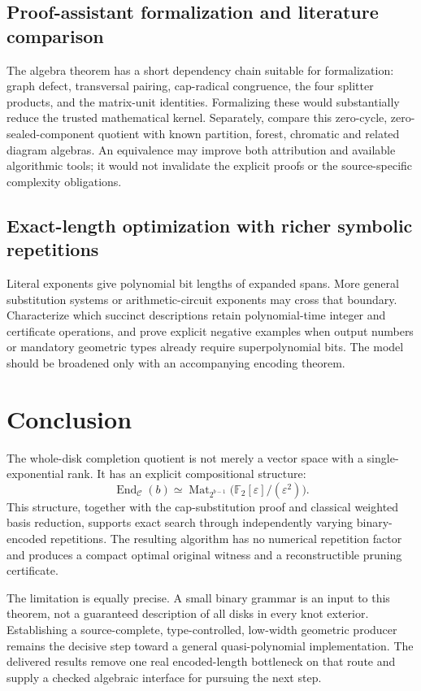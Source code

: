 \documentclass[11pt,a4paper]{article}
\theoremstyle{definition}
\newcommand{\F}{\mathbb F_2}
\newcommand{\Mat}{\operatorname{Mat}}
\newcommand{\End}{\operatorname{End}}
\newcommand{\eps}{\varepsilon}
\begin{document}
\subsection{Proof-assistant formalization and literature comparison}
The algebra theorem has a short dependency chain suitable for formalization: graph defect, transversal pairing, cap-radical congruence, the four splitter products, and the matrix-unit identities. Formalizing these would substantially reduce the trusted mathematical kernel. Separately, compare this zero-cycle, zero-sealed-component quotient with known partition, forest, chromatic and related diagram algebras. An equivalence may improve both attribution and available algorithmic tools; it would not invalidate the explicit proofs or the source-specific complexity obligations.

\subsection{Exact-length optimization with richer symbolic repetitions}
Literal exponents give polynomial bit lengths of expanded spans. More general substitution systems or arithmetic-circuit exponents may cross that boundary. Characterize which succinct descriptions retain polynomial-time integer and certificate operations, and prove explicit negative examples when output numbers or mandatory geometric types already require superpolynomial bits. The model should be broadened only with an accompanying encoding theorem.

\section{Conclusion}
The whole-disk completion quotient is not merely a vector space with a single-exponential rank. It has an explicit compositional structure:
\[
\End_{\mathcal C}(b)\simeq
\Mat_{2^{b-1}}\bigl(\F[\eps]/(\eps^2)\bigr).
\]
This structure, together with the cap-substitution proof and classical weighted basis reduction, supports exact search through independently varying binary-encoded repetitions. The resulting algorithm has no numerical repetition factor and produces a compact optimal original witness and a reconstructible pruning certificate.

The limitation is equally precise. A small binary grammar is an input to this theorem, not a guaranteed description of all disks in every knot exterior. Establishing a source-complete, type-controlled, low-width geometric producer remains the decisive step toward a general quasi-polynomial implementation. The delivered results remove one real encoded-length bottleneck on that route and supply a checked algebraic interface for pursuing the next step.
\end{document}
